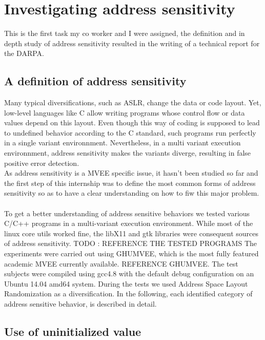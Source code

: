 \documentclass[english]{enstaPRE}
\begin{document}
\chapter{Investigating address sensitivity}

This is the first task my co worker and I were assigned, the definition and in depth study of address sensitivity resulted in the
writing of a technical report for the DARPA. 

\section{A definition of address sensitivity}

Many typical diversifications, such as ASLR, change the data or code layout. Yet, low-level languages like C allow writing programs whose
control flow or data values depend on this layout. Even though this way of coding is supposed to lead to undefined behavior according to the C standard, 
such programs run perfectly in a single variant environnment. Nevertheless, in a multi variant execution environnment, address sensitivity makes the variants
diverge, resulting in false positive error detection. \\
As address sensitivity is a MVEE specific issue, it hasn't been studied so far and the first step of this internship was to define the most common forms of address
sensitivity so as to have a clear understanding on how to fiw this major problem. \\ \\
To get a better understanding of address sensitive behaviors we tested various C/C++
programs in a multi-variant execution environment. While most of the linux core utils
worked fine, the libX11 and gtk libraries were consequent sources of address sensitivity.
TODO : REFERENCE THE TESTED PROGRAMS
The experiments were carried out using GHUMVEE, which is the most fully featured academic MVEE currently available. REFERENCE GHUMVEE.
The test subjects were compiled using gcc4.8
with the default debug configuration on an Ubuntu 14.04 amd64 system. During the tests we used Address Space Layout Randomization as a diversification.
In the following, each identified category of address sensitive behavior, is described in detail.


\section{Use of uninitialized value} \label{uninit}
\end{document}

